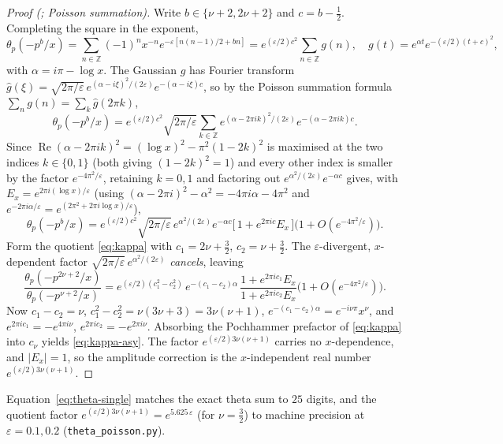 \begin{proof}[Proof \textnormal{(\proved; Poisson summation)}]
Write $b\in\{\nu+2,2\nu+2\}$ and $c=b-\tfrac12$. Completing the square in the exponent,
\[
   \theta_p(-p^{b}/x)
   =\sum_{n\in\mathbb Z}(-1)^n x^{-n}e^{-\varepsilon[n(n-1)/2+bn]}
   =e^{(\varepsilon/2)c^2}\sum_{n\in\mathbb Z} g(n),
   \quad g(t)=e^{\alpha t}e^{-(\varepsilon/2)(t+c)^2},
\]
with $\alpha=i\pi-\log x$. The Gaussian $g$ has Fourier transform
$\hat g(\xi)=\sqrt{2\pi/\varepsilon}\,e^{(\alpha-i\xi)^2/(2\varepsilon)}e^{-(\alpha-i\xi)c}$,
so by the Poisson summation formula $\sum_n g(n)=\sum_k\hat g(2\pi k)$,
\[
   \theta_p(-p^{b}/x)=e^{(\varepsilon/2)c^2}\sqrt{2\pi/\varepsilon}
      \sum_{k\in\mathbb Z}e^{(\alpha-2\pi i k)^2/(2\varepsilon)}e^{-(\alpha-2\pi i k)c}.
\]
Since $\operatorname{Re}(\alpha-2\pi ik)^2=(\log x)^2-\pi^2(1-2k)^2$ is maximised at the two
indices $k\in\{0,1\}$ (both giving $(1-2k)^2=1$) and every other index is smaller by the
factor $e^{-4\pi^2/\varepsilon}$, retaining $k=0,1$ and factoring out
$e^{\alpha^2/(2\varepsilon)}e^{-\alpha c}$ gives, with
$E_x=e^{2\pi i(\log x)/\varepsilon}$ (using
$(\alpha-2\pi i)^2-\alpha^2=-4\pi i\alpha-4\pi^2$ and
$e^{-2\pi i\alpha/\varepsilon}=e^{(2\pi^2+2\pi i\log x)/\varepsilon}$),
\begin{equation}\label{eq:theta-single}
   \theta_p(-p^{b}/x)=e^{(\varepsilon/2)c^2}\sqrt{2\pi/\varepsilon}\,
      e^{\alpha^2/(2\varepsilon)}e^{-\alpha c}\big[\,1+e^{2\pi ic}E_x\,\big]
      \big(1+O(e^{-4\pi^2/\varepsilon})\big).
\end{equation}
Form the quotient \eqref{eq:kappa} with $c_1=2\nu+\tfrac32$, $c_2=\nu+\tfrac32$. The
$\varepsilon$-divergent, $x$-dependent factor $\sqrt{2\pi/\varepsilon}\,e^{\alpha^2/(2\varepsilon)}$
\emph{cancels}, leaving
\[
   \frac{\theta_p(-p^{2\nu+2}/x)}{\theta_p(-p^{\nu+2}/x)}
   =e^{(\varepsilon/2)(c_1^2-c_2^2)}\,e^{-(c_1-c_2)\alpha}\,
    \frac{1+e^{2\pi ic_1}E_x}{1+e^{2\pi ic_2}E_x}\big(1+O(e^{-4\pi^2/\varepsilon})\big).
\]
Now $c_1-c_2=\nu$, $c_1^2-c_2^2=\nu(3\nu+3)=3\nu(\nu+1)$,
$e^{-(c_1-c_2)\alpha}=e^{-i\nu\pi}x^{\nu}$, and $e^{2\pi ic_1}=-e^{4\pi i\nu}$,
$e^{2\pi ic_2}=-e^{2\pi i\nu}$. Absorbing the Pochhammer prefactor of \eqref{eq:kappa} into
$c_\nu$ yields \eqref{eq:kappa-asy}. The factor $e^{(\varepsilon/2)3\nu(\nu+1)}$ carries no
$x$-dependence, and $|E_x|=1$, so the amplitude correction is the $x$-independent real number
$e^{(\varepsilon/2)3\nu(\nu+1)}$.
\end{proof}

\begin{remark}[\checked]
Equation~\eqref{eq:theta-single} matches the exact theta sum to $25$ digits, and the
quotient factor $e^{(\varepsilon/2)3\nu(\nu+1)}=e^{5.625\,\varepsilon}$ (for $\nu=\tfrac32$)
to machine precision at $\varepsilon=0.1,0.2$ (\texttt{theta\_poisson.py}).
\end{remark}

